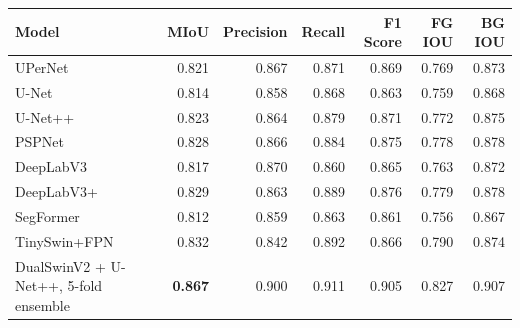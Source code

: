 \begin{table}\centering\scriptsize
	\begin{tabular}{lrrrrrr}\toprule
		\textbf{Model}                                                                                    & \textbf{MIoU}  & \textbf{Precision } & \textbf{Recall} & \textbf{F1 Score} & \textbf{FG IOU} & \textbf{BG IOU} \\
		\midrule
		UPerNet~\cite{DBLP:journals/corr/abs-1807-10221}                                                  & 0.821          & 0.867               & 0.871           & 0.869             & 0.769           & 0.873           \\
		U-Net~\cite{ronneberger2015unet}                                                                  & 0.814          & 0.858               & 0.868           & 0.863             & 0.759           & 0.868           \\
		U-Net++~\cite{zhou2019unetplusplus}                                                               & 0.823          & 0.864               & 0.879           & 0.871             & 0.772           & 0.875           \\
		PSPNet~\cite{zhao2017pyramidsceneparsingnetwork}                                                  & 0.828          & 0.866               & 0.884           & 0.875             & 0.778           & 0.878           \\
		DeepLabV3~\cite{chen2017deeplabsemanticimagesegmentation}                                         & 0.817          & 0.870               & 0.860           & 0.865             & 0.763           & 0.872           \\
		DeepLabV3+~\cite{DBLP:journals/corr/abs-1802-02611}                                               & 0.829          & 0.863               & 0.889           & 0.876             & 0.779           & 0.878           \\
		SegFormer~\cite{xie2021segformer}                                                                 & 0.812          & 0.859               & 0.863           & 0.861             & 0.756           & 0.867           \\
		TinySwin+FPN~\cite{kabir2026dualswinfusionsegmultimodalmartianlandslide}                          & 0.832          & 0.842               & 0.892           & 0.866             & 0.790           & 0.874           \\
		DualSwinV2 + U-Net++, 5-fold ensemble~\cite{kabir2026dualswinfusionsegmultimodalmartianlandslide} & \textbf{0.867} & 0.900               & 0.911           & 0.905             & 0.827           & 0.907           \\

\end{tabular}
\end{table}
